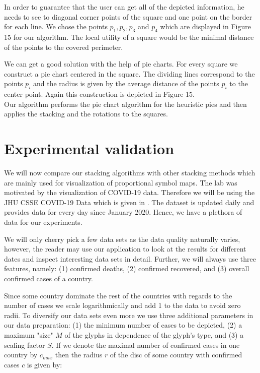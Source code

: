 \documentclass[a4paper,11pt]{article}
\begin{document}
In order to guarantee that the user can get all of the depicted information, he needs to see to diagonal corner points of the square and one point on the border for each line. We chose the points $p_1,p_2,p_3$ and $p_4$ which are displayed in Figure 15 for our algorithm. The local utility of a square would be the minimal distance of the points to the covered perimeter.

We can get a good solution with the help of pie charts. For every square we construct a pie chart centered in the square. The dividing lines correspond to the points $p_i$ and the radius is given by the average distance of the points $p_i$ to the center point. Again this construction is depicted in Figure 15.
\\Our algorithm performs the pie chart algorithm for the heuristic pies and then applies the stacking and the rotations to the squares.

\section{Experimental validation}

We will now compare our stacking algorithms with other stacking methods which are mainly used for visualization of proportional symbol maps. The lab was motivated by the visualization of COVID-19 data. Therefore we will be using the JHU CSSE COVID-19 Data which is given in \cite{data}. The dataset is updated daily and provides data for every day since January 2020. Hence, we have a plethora of data for our experiments.

We will only cherry pick a few data sets as the data quality naturally varies, however, the reader may use our application to look at the results for different dates and inspect interesting data sets in detail. Further, we will always use three features, namely: (1) confirmed deaths, (2) confirmed recovered, and (3) overall confirmed cases of a country.

Since some country dominate the rest of the countries with regards to the number of cases we scale logarithmically and add 1 to the data to avoid zero radii. To diversify our data sets even more we use three additional parameters in our data preparation: (1) the minimum number of cases to be depicted, (2) a maximum "size" $M$ of the glyphs in dependence of the glyph's type, and (3) a scaling factor $S$. If we denote the maximal number of confirmed cases in one country by $c_{max}$ then the radius $r$ of the disc of some country with confirmed cases $c$ is given by:
\end{document}
